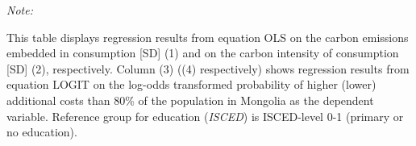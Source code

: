 \begin{table}[htbp!]
\begin{adjustbox}{width = 1\textwidth, max height = 0.95\textheight, center}
\begin{threeparttable}[b]
         \begin{tablenotes}\item \medskip \textit{Note:}
            \item This table displays regression results from equation OLS on the carbon emissions embedded in consumption [SD] (1) and on the carbon intensity of consumption [SD] (2), respectively. 
                                      Column (3) ((4) respectively) shows regression results from equation LOGIT on the log-odds transformed probability of higher (lower) additional costs than 80\% of the population in Mongolia as the dependent variable. Reference group for education (\textit{ISCED}) is ISCED-level 0-1 (primary or no education).
         \end{tablenotes}
      \end{threeparttable}
   \end{adjustbox}
\end{table}


